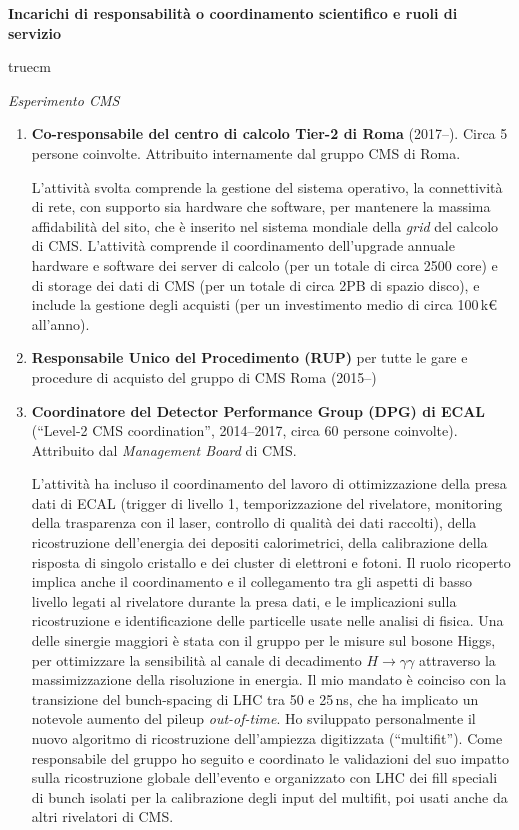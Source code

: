 \documentclass[11pt,twoside,a4paper]{article}
\begin{document}
\begin{center}
\textbf{Incarichi di responsabilit\`a o coordinamento scientifico e ruoli di servizio}
\end{center}
 truecm

\textit{Esperimento CMS}
\begin{enumerate}
\item \textbf{Co-responsabile del centro di calcolo Tier-2 di Roma}
  (2017--). Circa 5 persone coinvolte. Attribuito internamente dal
  gruppo CMS di Roma.

  L'attivit\`a svolta comprende la gestione del sistema operativo, la
  connettivit\`a di rete, con supporto sia hardware che software, per
  mantenere la massima affidabilit\`a del sito, che \`e inserito nel
  sistema mondiale della \textit{grid} del calcolo di CMS.
  L'attivit\`a comprende il coordinamento dell'upgrade annuale
  hardware e software dei server di calcolo (per un totale di circa
  2500 core) e di storage dei dati di CMS (per un totale di circa 2PB
  di spazio disco), e include la gestione degli acquisti (per un
  investimento medio di circa 100\,k\euro{} all'anno).

\item \textbf{Responsabile Unico del Procedimento (RUP)} per tutte le gare e
  procedure di acquisto del gruppo di CMS Roma (2015--)

\item \textbf{Coordinatore del Detector Performance Group (DPG) di ECAL}
  (``Level-2 CMS coordination'', 2014--2017, circa 60 persone
  coinvolte). Attribuito dal \textit{Management Board} di CMS.

  L'attivit\`a ha incluso il coordinamento del lavoro di
  ottimizzazione della presa dati di ECAL (trigger di livello 1,
  temporizzazione del rivelatore, monitoring della trasparenza con il
  laser, controllo di qualit\`a dei dati raccolti), della
  ricostruzione dell'energia dei depositi calorimetrici, della
  calibrazione della risposta di singolo cristallo e dei cluster di
  elettroni e fotoni. Il ruolo ricoperto implica anche il
  coordinamento e il collegamento tra gli aspetti di basso livello
  legati al rivelatore durante la presa dati, e le implicazioni sulla
  ricostruzione e identificazione delle particelle usate nelle analisi
  di fisica. Una delle sinergie maggiori \`e stata con il gruppo per
  le misure sul bosone Higgs, per ottimizzare la sensibilit\`a al
  canale di decadimento $H\to\gamma\gamma$ attraverso la
  massimizzazione della risoluzione in energia. Il mio mandato \`e
  coinciso con la transizione del bunch-spacing di LHC tra 50 e
  25\,ns, che ha implicato un notevole aumento del pileup
  \textit{out-of-time}.  Ho sviluppato personalmente il nuovo
  algoritmo di ricostruzione dell'ampiezza digitizzata
  (``multifit''). Come responsabile del gruppo ho seguito e coordinato
  le validazioni del suo impatto sulla ricostruzione globale
  dell'evento e organizzato con LHC dei fill speciali di bunch isolati
  per la calibrazione degli input del multifit, poi usati anche da
  altri rivelatori di CMS.


\end{enumerate}
\end{document}
